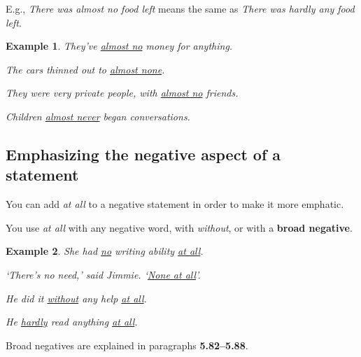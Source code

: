 \documentclass[oneside]{book}
\numberwithin{equation}{section}
\newtheorem{example}{Example}[section]
\begin{document}
E.g., \textit{There was almost no food left} means the same as \textit{There was hardly any food left}.
\begin{example}
    They've \underline{almost no} money for anything.
    
    The cars thinned out to \underline{almost none}.
    
    They were very private people, with \underline{almost no} friends.
    
    Children \underline{almost never} began conversations.
\end{example}

\subsection{Emphasizing the negative aspect of a statement}
\noindent{} You can add \textit{at all} to a negative statement in order to make it more emphatic.

You use \textit{at all} with any negative word, with \textit{without}, or with a \textbf{broad negative}.
\begin{example}
    She had \underline{no} writing ability \underline{at all}.
    
    `There's no need,' said Jimmie. `\underline{None at all}'.
    
    He did it \underline{without} any help \underline{at all}.
    
    He \underline{hardly} read anything \underline{at all}.
\end{example}
Broad negatives are explained in paragraphs \textbf{5.82--5.88}.
\end{document}
